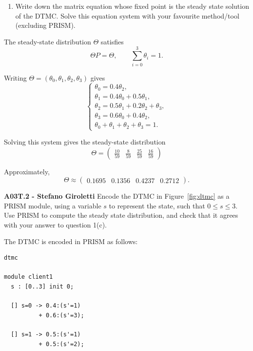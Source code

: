 \documentclass[12pt,a4paper]{article}
\begin{document}
\begin{description}
\begin{enumerate}[label=\alph*)]
Therefore,
\[
\boxed{
\Theta_3 = \Theta_2 P
= \begin{pmatrix}0.32 & 0.10 & 0.26 & 0.32\end{pmatrix}
}
\]

\color{black}
\fi
%
\item Write down the matrix equation whose fixed point is the steady state solution of the DTMC. Solve this equation system with your favourite method/tool (excluding PRISM). 
\end{enumerate}
%
\ifwithanswers
\color{blue}
\par
The steady-state distribution $\Theta$ satisfies
\[
\Theta P = \Theta,
\qquad
\sum_{i=0}^{3}\theta_i = 1.
\]

Writing $\Theta = (\theta_0,\theta_1,\theta_2,\theta_3)$ gives
\[
\begin{cases}
\theta_0 = 0.4\theta_2,\\
\theta_1 = 0.4\theta_0 + 0.5\theta_1,\\
\theta_2 = 0.5\theta_1 + 0.2\theta_2 + \theta_3,\\
\theta_3 = 0.6\theta_0 + 0.4\theta_2,\\
\theta_0+\theta_1+\theta_2+\theta_3=1.
\end{cases}
\]

Solving this system gives the steady-state distribution
\[
\boxed{
\Theta =
\begin{pmatrix}
\frac{10}{59} & \frac{8}{59} & \frac{25}{59} & \frac{16}{59}
\end{pmatrix}
}
\]

Approximately,
\[
\Theta \approx
\begin{pmatrix}
0.1695 & 0.1356 & 0.4237 & 0.2712
\end{pmatrix}.
\]

\color{black}
\fi
%
\item{\bf A03T.2 - Stefano Giroletti} Encode the DTMC in Figure~\ref{fig:dtmc} as a PRISM module, using a variable $s$ to represent the state, such that $0 \le s \le 3$.
Use PRISM to compute the steady state distribution, and check that it
agrees with your answer to question 1(c).
%
\ifwithanswers
\color{blue}
\par\medskip
\noindent The DTMC is encoded in PRISM as follows:
\begin{verbatim}
dtmc

module client1
  s : [0..3] init 0;

  [] s=0 -> 0.4:(s'=1)
          + 0.6:(s'=3);

  [] s=1 -> 0.5:(s'=1)
          + 0.5:(s'=2);


\end{verbatim}
\end{description}
\end{document}

